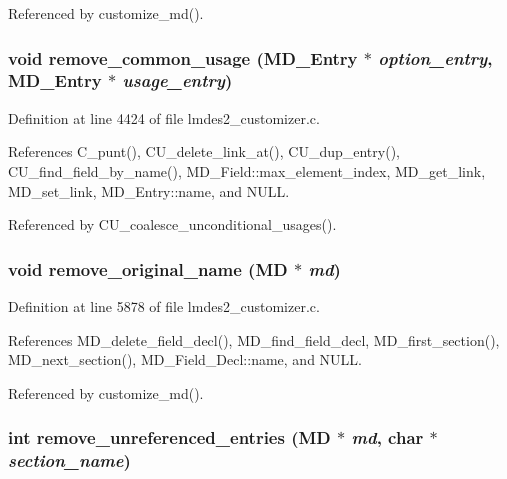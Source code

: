 Referenced by customize\_\-md().
\subsubsection{\setlength{\rightskip}{0pt plus 5cm}void remove\_\-common\_\-usage (\bf{MD\_\-Entry} $\ast$ {\em option\_\-entry}, \bf{MD\_\-Entry} $\ast$ {\em usage\_\-entry})}\label{lmdes2__customizer_8c_bd8894f969d13c98f666bbf98a5383a3}




Definition at line 4424 of file lmdes2\_\-customizer.c.

References C\_\-punt(), CU\_\-delete\_\-link\_\-at(), CU\_\-dup\_\-entry(), CU\_\-find\_\-field\_\-by\_\-name(), MD\_\-Field::max\_\-element\_\-index, MD\_\-get\_\-link, MD\_\-set\_\-link, MD\_\-Entry::name, and NULL.

Referenced by CU\_\-coalesce\_\-unconditional\_\-usages().
\subsubsection{\setlength{\rightskip}{0pt plus 5cm}void remove\_\-original\_\-name (\bf{MD} $\ast$ {\em md})}\label{lmdes2__customizer_8c_6747e11fe0efbbeea18472c8a80f3a2c}




Definition at line 5878 of file lmdes2\_\-customizer.c.

References MD\_\-delete\_\-field\_\-decl(), MD\_\-find\_\-field\_\-decl, MD\_\-first\_\-section(), MD\_\-next\_\-section(), MD\_\-Field\_\-Decl::name, and NULL.

Referenced by customize\_\-md().
\subsubsection{\setlength{\rightskip}{0pt plus 5cm}int remove\_\-unreferenced\_\-entries (\bf{MD} $\ast$ {\em md}, char $\ast$ {\em section\_\-name})}\label{lmdes2__customizer_8c_a4a74696d0e80cb977df64ded2259566}





